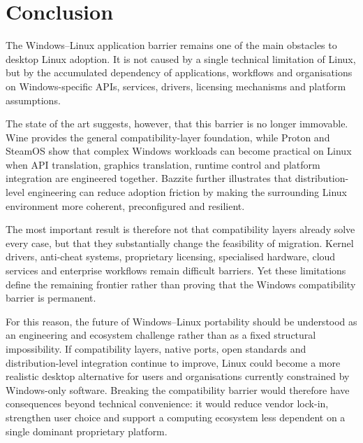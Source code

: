 \documentclass[conference]{IEEEtran}
\begin{document}
\section{Conclusion}

The Windows--Linux application barrier remains one of the main obstacles to desktop Linux adoption. It is not caused by a single technical limitation of Linux, but by the accumulated dependency of applications, workflows and organisations on Windows-specific APIs, services, drivers, licensing mechanisms and platform assumptions.

The state of the art suggests, however, that this barrier is no longer immovable. Wine provides the general compatibility-layer foundation, while Proton and SteamOS show that complex Windows workloads can become practical on Linux when API translation, graphics translation, runtime control and platform integration are engineered together. Bazzite further illustrates that distribution-level engineering can reduce adoption friction by making the surrounding Linux environment more coherent, preconfigured and resilient.

The most important result is therefore not that compatibility layers already solve every case, but that they substantially change the feasibility of migration. Kernel drivers, anti-cheat systems, proprietary licensing, specialised hardware, cloud services and enterprise workflows remain difficult barriers. Yet these limitations define the remaining frontier rather than proving that the Windows compatibility barrier is permanent.

For this reason, the future of Windows--Linux portability should be understood as an engineering and ecosystem challenge rather than as a fixed structural impossibility. If compatibility layers, native ports, open standards and distribution-level integration continue to improve, Linux could become a more realistic desktop alternative for users and organisations currently constrained by Windows-only software. Breaking the compatibility barrier would therefore have consequences beyond technical convenience: it would reduce vendor lock-in, strengthen user choice and support a computing ecosystem less dependent on a single dominant proprietary platform.



\end{document}
